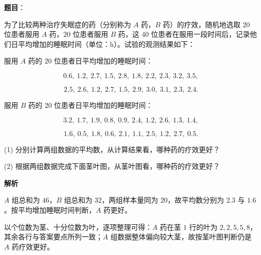 \begin{answer}

\textbf{题目}：

为了比较两种治疗失眠症的药（分别称为 $A$ 药，$B$ 药）的疗效，随机地选取 $20$ 位患者服用 $A$ 药，$20$ 位患者服用 $B$ 药，这 $40$ 位患者在服用一段时间后，记录他们日平均增加的睡眠时间（单位：h）。试验的观测结果如下：

服用 $A$ 药的 $20$ 位患者日平均增加的睡眠时间：

\nopagebreak[4]
\[
0.6,\ 1.2,\ 2.7,\ 1.5,\ 2.8,\ 1.8,\ 2.2,\ 2.3,\ 3.2,\ 3.5,
\]

\nopagebreak[4]
\[
2.5,\ 2.6,\ 1.2,\ 2.7,\ 1.5,\ 2.9,\ 3.0,\ 3.1,\ 2.3,\ 2.4.
\]

服用 $B$ 药的 $20$ 位患者日平均增加的睡眠时间：

\nopagebreak[4]
\[
3.2,\ 1.7,\ 1.9,\ 0.8,\ 0.9,\ 2.4,\ 1.2,\ 2.6,\ 1.3,\ 1.4,
\]

\nopagebreak[4]
\[
1.6,\ 0.5,\ 1.8,\ 0.6,\ 2.1,\ 1.1,\ 2.5,\ 1.2,\ 2.7,\ 0.5.
\]

(1) 分别计算两组数据的平均数，从计算结果看，哪种药的疗效更好？

(2) 根据两组数据完成下面茎叶图，从茎叶图看，哪种药的疗效更好？
\nopagebreak[4]
\begin{center}\end{center}
\nopagebreak[4]
\textbf{解析}


$A$ 组总和为 $46$，$B$ 组总和为 $32$，两组样本量同为 $20$，故平均数分别为 $2.3$ 与 $1.6$。按平均增加睡眠时间判断，$A$ 药更好。


以个位数为茎、十分位数为叶，逐项整理可得：$A$ 药在茎 $1$ 行的叶为 $2,2,5,5,8$，其余各行与答案要点所列一致；$A$ 组数据整体偏向较大茎，故按茎叶图判断仍是 $A$ 药疗效更好。



\end{answer}

